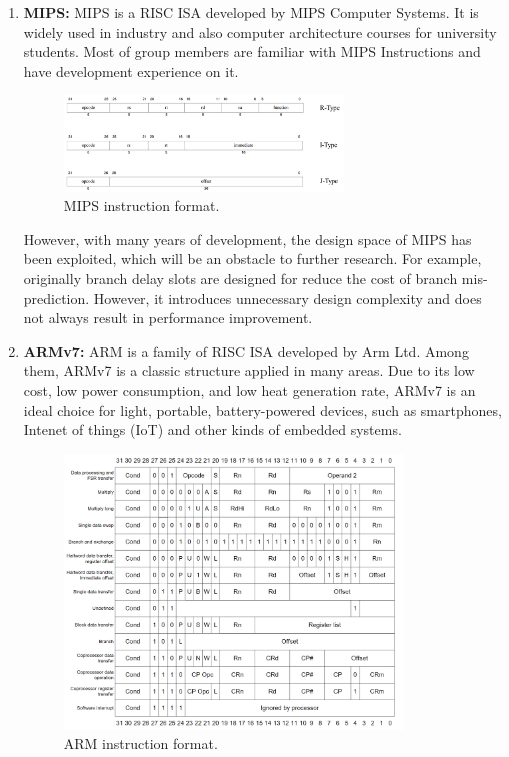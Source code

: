 \begin{enumerate}
\item \textbf{MIPS:} MIPS is a RISC ISA developed by MIPS Computer Systems. It is widely used in industry and also computer architecture courses for university students. Most of group members are familiar with MIPS Instructions and have development experience on it.

\begin{figure}[!htp]
    \centering
    \includegraphics[width=0.7\textwidth]{figure/MIPS-instruction-format-18.png}
    \caption{MIPS instruction format.}
    \label{fig:mips_inst}
\end{figure}

However, with many years of development, the design space of MIPS has been exploited, which will be an obstacle to further research. For example, originally branch delay slots are designed for reduce the cost of branch mis-prediction. However, it introduces unnecessary design complexity and does not always result in performance improvement.

\item \textbf{ARMv7:} ARM is a family of RISC ISA developed by Arm Ltd. Among them, ARMv7 is a classic structure applied in many areas. Due to its low cost, low power consumption, and low heat generation rate, ARMv7 is an ideal choice for light, portable, battery-powered devices, such as smartphones, Intenet of things (IoT) and other kinds of embedded systems.

\begin{figure}[!htp]
    \centering
    \includegraphics[width=0.85\textwidth]{figure/arm_ist.png}
    \caption{ARM instruction format.}
    \label{fig:arm_ist}
\end{figure}


\end{enumerate}
